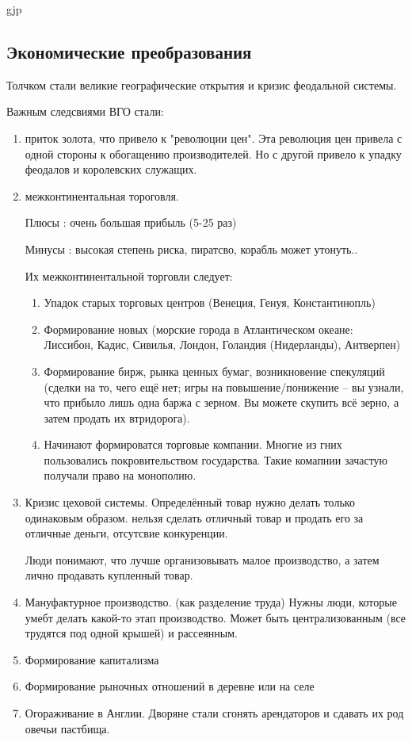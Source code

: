 gjp	 \documentclass[12pt,a4paper]{article}
\begin{document}
\subsection{Экономические преобразования}

Толчком стали великие географические открытия и кризис феодальной системы.

Важным следсвиями ВГО стали:
\begin{enumerate}
	\item приток золота, что привело к "революции цен". Эта революция цен привела с одной стороны к обогащению производителей. Но с другой привело к упадку феодалов и королевских служащих.
	\item межконтинентальная тороговля. 
	
	Плюсы : очень большая прибыль (5-25 раз)
	
	Минусы : высокая степень риска, пиратсво, корабль может утонуть..
	
	Их межконтинентальной торговли следует:
	\begin{enumerate}
		\item Упадок старых торговых центров (Венеция, Генуя, Константинопль)
		\item Формирование новых (морские города в Атлантическом океане: Лиссибон, Кадис, Сивилья, Лондон, Голандия (Нидерланды), Антверпен)
		\item Формирование бирж, рынка ценных бумаг, возникновение спекуляций (сделки на то, чего ещё нет; игры на повышение/понижение -- вы узнали, что прибыло лишь одна баржа с зерном. Вы можете скупить всё зерно, а затем продать их втридорога).
		\item Начинают формироватся торговые компании. Многие из гних пользовались покровительством государства. Такие комапнии зачастую получали право на монополию.
	\end{enumerate}
	\item Кризис цеховой системы. Определённый товар нужно делать только одинаковым образом. нельзя сделать отличный товар и продать его за отличные деньги, отсутсвие конкуренции.
	
	Люди понимают, что лучше организовывать малое производство, а затем лично продавать купленный товар.
	\item Мануфактурное производство. (как разделение труда) Нужны люди, которые умебт делать какой-то этап производство. Может быть централизованным (все трудятся под одной крышей) и рассеянным. 
	\item Формирование капитализма
	\item Формирование рыночных отношений в деревне или на селе
	\item Огораживание в Англии. Дворяне стали сгонять арендаторов и сдавать их род овечьи пастбища.



\end{enumerate}
\end{document}
